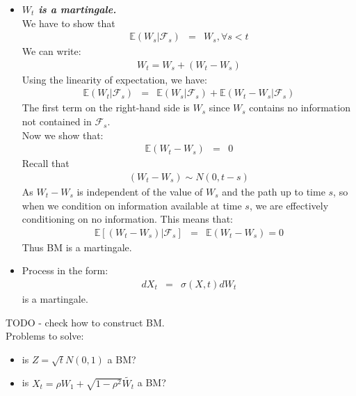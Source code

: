 \begin{itemize}
	\item \textbf{\textit{$W_{t}$ is a martingale.}}\\
	We have to show that
	\begin{eqnarray}
	\mathbb{E}(W_{s}\vert\mathscr{F}_{s}) &=& W_{s}, \forall s < t
	\end{eqnarray}
	We can write:
	\begin{eqnarray}
	W_{t} = W_{s} + (W_{t} - W_{s})
	\end{eqnarray}
	Using the linearity of expectation, we have:
	\begin{eqnarray}
	\mathbb{E}(W_{t}\vert \mathscr{F}_{s}) &=& \mathbb{E}(W_{s}\vert \mathscr{F}_{s}) + \mathbb{E}(W_{t} - W_{s}\vert\mathscr{F}_{s})
	\end{eqnarray}
	The first term on the right-hand side is $W_{s}$ since $W_{s}$ contains no information not contained in $\mathscr{F}_{s}$.\\
	Now we show that:\\
	\begin{eqnarray}
	\mathbb{E}(W_{t} - W_{s}) &=& 0
	\end{eqnarray}
	Recall that
	\begin{eqnarray}
	(W_{t} - W_{s}) \sim N(0, t - s)
	\end{eqnarray}
	As $W_{t} - W_{s}$ is independent of the value of $W_{s}$ and the path up to time $s$, so when we condition on information available at time $s$, we are effectively conditioning on no information. This means that:
	\begin{eqnarray}
	\mathbb{E}[(W_{t} - W_{s})\vert \mathscr{F}_{s}]&=& \mathbb{E}(W_{t} - W_{s}) = 0
	\end{eqnarray}
	Thus BM is a martingale.
	\item Process in the form:
	\begin{eqnarray}
	dX_{t} &=& \sigma(X, t)dW_{t}
	\end{eqnarray}
	is a martingale.
\end{itemize}


TODO - check how to construct BM.\\
Problems to solve:
\begin{itemize}
	\item is $Z = \sqrt{t}N(0,1)$ a BM?
	\item is $X_{t} = \rho W_{1} + \sqrt{1 - \rho^{2}}\tilde{W_{t}}$ a BM?
\end{itemize}
